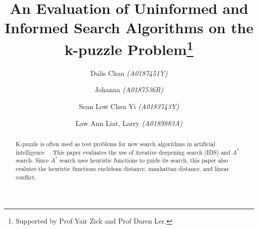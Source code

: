 \documentclass[runningheads]{llncs}
\begin{document}
%
\title{An Evaluation of Uninformed and Informed Search Algorithms on the k-puzzle Problem\thanks{Supported by Prof Yair Zick and Prof Daren Ler.}}
%
%
\author{Dalis Chan \textit{(A0187451Y)} \and
Johanna \textit{(A0187536R)} \and
Sean Low Chen Yi \textit{(A0183743Y)} \and 
Law Ann Liat, Larry \textit{(A0189883A)}}
%
%

%
\maketitle              %
%
\begin{abstract}
K-puzzle is often used as test problems for new search algorithms in artificial intelligence ~\cite[p71]{stuart_russell_artifical_2010}. This paper evaluates the use of iterative deepening search (IDS) and \( A^* \) search. 
Since \( A^* \) search uses heuristic functions to guide its search, this paper also evalutes the heuristic functions euclidean distance, manhattan distance, and linear conflict.
\end{abstract}
%
%
%
\end{document}
